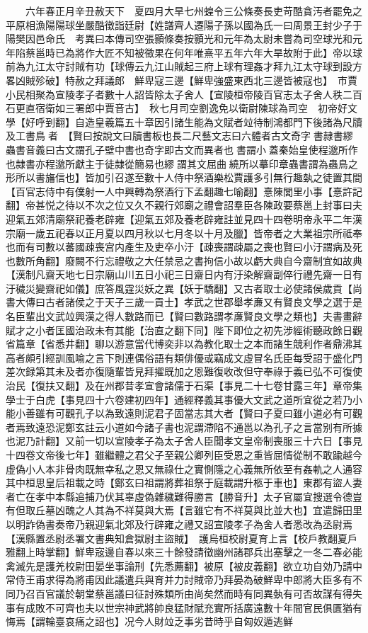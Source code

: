 　　六年春正月辛丑赦天下　夏四月大旱七州蝗令三公條奏長吏苛酷貪汚者罷免之平原相漁陽陽球坐嚴酷徵詣廷尉【姓譜齊人遷陽子孫以國為氏一曰周景王封少子于陽樊因邑命氏　考異曰本傳司空張顥條奏按顥光和元年為太尉未嘗為司空球光和元年陷蔡邕時已為將作大匠不知被徵果在何年唯熹平五年六年大旱故附于此】帝以球前為九江太守討賊有功【球傳云九江山賊起三府上球有理姦才拜九江太守球到設方畧凶賊殄破】特赦之拜議郎　鮮卑寇三邊【鮮卑強盛東西北三邊皆被寇也】　市賈小民相聚為宣陵孝子者數十人詔皆除太子舍人【宣陵桓帝陵百官志太子舍人秩二百石更直宿衛如三署郎中賈音古】　秋七月司空劉逸免以衛尉陳球為司空　初帝好文學【好呼到翻】自造皇羲篇五十章因引諸生能為文賦者竝待制鴻都門下後諸為尺牘及工書鳥者　【賢曰按說文曰牘書板也長二尺藝文志曰六體者古文奇字書隷書繆蟲書音義曰古文謂孔子壁中書也奇字即古文而異者也書謂小蓋秦始皇使程邈所作也隷書亦程邈所獻主于徒隷從簡易也繆謂其文屈曲繞所以摹印章蟲書謂為蟲鳥之形所以書旛信也】皆加引召遂至數十人侍中祭酒樂松賈護多引無行趣埶之徒置其間【百官志侍中有僕射一人中興轉為祭酒行下孟翻趣七喻翻】憙陳閭里小事【憙許記翻】帝甚悦之待以不次之位又久不親行郊廟之禮會詔羣臣各陳政要蔡邕上封事曰夫迎氣五郊清廟祭祀養老辟雍【迎氣五郊及養老辟雍註並見四十四卷明帝永平二年漢宗廟一歲五祀春以正月夏以四月秋以七月冬以十月及臘】皆帝者之大業祖宗所祗奉也而有司數以蕃國疎喪宫内產生及吏卒小汙【疎喪謂疎屬之喪也賢曰小汙謂病及死也數所角翻】廢闕不行忘禮敬之大任禁忌之書拘信小故以虧大典自今齋制宜如故典【漢制凡齋天地七日宗廟山川五日小祀三日齋日内有汙染解齋副倅行禮先齋一日有汙穢災變齋祀如儀】庶答風霆災妖之異【妖于驕翻】又古者取士必使諸侯歲貢【尚書大傳曰古者諸侯之于天子三歲一貢士】孝武之世郡舉孝亷又有賢良文學之選于是名臣輩出文武竝興漢之得人數路而已【賢曰數路謂孝亷賢良文學之類也】夫書畫辭賦才之小者匡國治政未有其能【治直之翻下同】陛下即位之初先涉經術聽政餘日觀省篇章【省悉井翻】聊以游意當代博奕非以為教化取士之本而諸生競利作者鼎沸其高者頗引經訓風喻之言下則連偶俗語有類俳優或竊成文虛冒名氏臣每受詔于盛化門差次録第其未及者亦復隨輩皆見拜擢既加之恩難復收改但守奉祿于義已弘不可復使治民【復扶又翻】及在州郡昔孝宣會諸儒于石渠【事見二十七卷甘露三年】章帝集學士于白虎【事見四十六卷建初四年】通經釋義其事優大文武之道所宜從之若乃小能小善雖有可觀孔子以為致遠則泥君子固當志其大者【賢曰子夏曰雖小道必有可觀者焉致遠恐泥鄭玄註云小道如今諸子書也泥謂滯陷不通邕以為孔子之言當别有所據也泥乃計翻】又前一切以宣陵孝子為太子舍人臣聞孝文皇帝制喪服三十六日【事見十四卷文帝後七年】雖繼體之君父子至親公卿列臣受恩之重皆屈情從制不敢踰越今虛偽小人本非骨肉既無幸私之恩又無祿仕之實惻隱之心義無所依至有姦軌之人通容其中桓思皇后祖載之時【鄭玄曰祖謂將葬祖祭于庭載謂升柩于車也】東郡有盜人妻者亡在孝中本縣追捕乃伏其辜虛偽雜穢難得勝言【勝音升】太子官屬宜搜選令德豈有但取丘墓凶醜之人其為不祥莫與大焉【言雖它有不祥莫與比並大也】宜遣歸田里以明詐偽書奏帝乃親迎氣北郊及行辟雍之禮又詔宣陵孝子為舍人者悉改為丞尉焉【漢縣置丞尉丞署文書典知倉獄尉主盜賊】　護烏桓校尉夏育上言【校戶教翻夏戶雅翻上時掌翻】鮮卑宼邊自春以來三十餘發請徵幽州諸郡兵出塞擊之一冬二春必能禽滅先是護羌校尉田晏坐事論刑【先悉薦翻】被原【被皮義翻】欲立功自効乃請中常侍王甫求得為將甫因此議遣兵與育并力討賊帝乃拜晏為破鮮卑中郎將大臣多有不同乃召百官議於朝堂蔡邕議曰征討殊類所由尚矣然而時有同異埶有可否故謀有得失事有成敗不可齊也夫以世宗神武將帥良猛財賦充實所括廣遠數十年間官民俱匱猶有悔焉【謂輪臺哀痛之詔也】况今人財竝乏事劣昔時乎自匈奴遁逃鮮